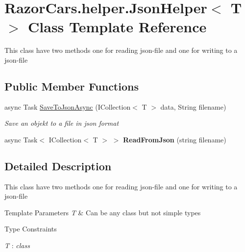 \hypertarget{class_razor_cars_1_1helper_1_1_json_helper}{}\section{Razor\+Cars.\+helper.\+Json\+Helper$<$ T $>$ Class Template Reference}
\label{class_razor_cars_1_1helper_1_1_json_helper}


This class have two methods one for reading json-\/file and one for writing to a json-\/file  


\subsection*{Public Member Functions}
\begin{DoxyCompactItemize}
\item 
async Task \mbox{\hyperlink{class_razor_cars_1_1helper_1_1_json_helper_a04e7a7779fbee18fae01fd9fca1133e7}{Save\+To\+Json\+Async}} (I\+Collection$<$ T $>$ data, String filename)
\begin{DoxyCompactList}\small\item\em Save an objekt to a file in json format \end{DoxyCompactList}\item 
\mbox{\label{class_razor_cars_1_1helper_1_1_json_helper_a287cc2c615574e975f07c58baadf9dc9}} 
async Task$<$ I\+Collection$<$ T $>$ $>$ {\bfseries Read\+From\+Json} (string filename)
\end{DoxyCompactItemize}


\subsection{Detailed Description}
This class have two methods one for reading json-\/file and one for writing to a json-\/file 


\begin{DoxyTemplParams}{Template Parameters}
{\em T} & Can be any class but not simple types\\
\hline
\end{DoxyTemplParams}
\begin{Desc}
\item[Type Constraints]\begin{description}
\item[{\em T} : {\em class}]\end{description}
\end{Desc}


